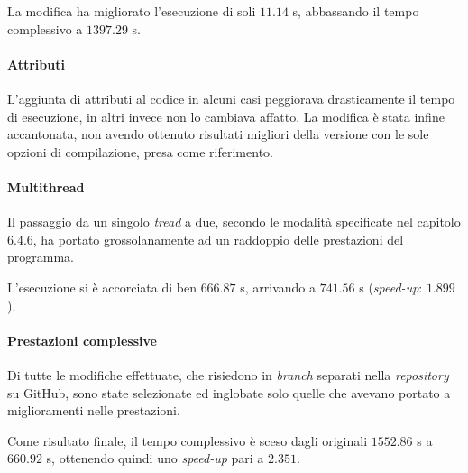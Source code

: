   La modifica ha migliorato l'esecuzione di soli $11.14$ s, abbassando il tempo 
  complessivo a $1397.29$ s.
  
\paragraph{Attributi \\}
  L'aggiunta di attributi al codice in alcuni casi peggiorava drasticamente il 
  tempo di esecuzione, in altri invece non lo cambiava affatto. La modifica è 
  stata infine accantonata, non avendo ottenuto risultati migliori della 
  versione con le sole opzioni di compilazione, presa come riferimento.
  
\paragraph{Multithread \\}
  Il passaggio da un singolo \emph{tread} a due, secondo le modalità 
  specificate nel capitolo 6.4.6, ha portato grossolanamente ad un raddoppio 
  delle prestazioni del programma.
  
  L'esecuzione si è accorciata di ben $666.87$ s, arrivando a $741.56$ s 
  (\textit{speed-up}: $1.899$).

\paragraph{Prestazioni complessive \\}
  Di tutte le modifiche effettuate, che risiedono in \textit{branch} separati 
  nella \textit{repository} su GitHub, sono state selezionate ed inglobate solo 
  quelle che avevano portato a miglioramenti nelle prestazioni.
  
  Come risultato finale, il tempo complessivo è sceso dagli originali $1552.86$ 
  s a $660.92$ s, ottenendo quindi uno \textit{speed-up} pari a $2.351$.
    

